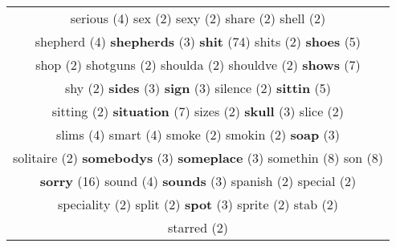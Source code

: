 \documentclass[12pt,a4paper]{article}
\begin{document}
\begin{center}
\begin{longtable}{|c|}
{\normalsize \textcolor{VerdeLocao} {serious}} \footnotesize{(4)} {\footnotesize \textcolor{Verde} {sex}} \footnotesize{(2)} {\footnotesize \textcolor{Verde} {sexy}} \footnotesize{(2)} {\footnotesize \textcolor{Verde} {share}} \footnotesize{(2)} {\footnotesize \textcolor{Verde} {shell}} \footnotesize{(2)}  \\ {\normalsize \textcolor{VerdeLocao} {shepherd}} \footnotesize{(4)} {\small \textcolor{Laranja} {\bf shepherds}} \footnotesize{(3)} {\Huge \textcolor{AzulEscuro} {\bf shit}} \footnotesize{(74)} {\footnotesize \textcolor{Verde} {shits}} \footnotesize{(2)} {\large \textcolor{Roxo} {\bf shoes}} \footnotesize{(5)}  \\ {\footnotesize \textcolor{Verde} {shop}} \footnotesize{(2)} {\footnotesize \textcolor{Verde} {shotguns}} \footnotesize{(2)} {\footnotesize \textcolor{Verde} {shoulda}} \footnotesize{(2)} {\footnotesize \textcolor{Verde} {shouldve}} \footnotesize{(2)} {\LARGE \textcolor{Rosa} {\bf shows}} \footnotesize{(7)}  \\ {\footnotesize \textcolor{Verde} {shy}} \footnotesize{(2)} {\small \textcolor{Laranja} {\bf sides}} \footnotesize{(3)} {\small \textcolor{Laranja} {\bf sign}} \footnotesize{(3)} {\footnotesize \textcolor{Verde} {silence}} \footnotesize{(2)} {\large \textcolor{Roxo} {\bf sittin}} \footnotesize{(5)}  \\ {\footnotesize \textcolor{Verde} {sitting}} \footnotesize{(2)} {\LARGE \textcolor{Rosa} {\bf situation}} \footnotesize{(7)} {\footnotesize \textcolor{Verde} {sizes}} \footnotesize{(2)} {\small \textcolor{Laranja} {\bf skull}} \footnotesize{(3)} {\footnotesize \textcolor{Verde} {slice}} \footnotesize{(2)}  \\ {\normalsize \textcolor{VerdeLocao} {slims}} \footnotesize{(4)} {\normalsize \textcolor{VerdeLocao} {smart}} \footnotesize{(4)} {\footnotesize \textcolor{Verde} {smoke}} \footnotesize{(2)} {\footnotesize \textcolor{Verde} {smokin}} \footnotesize{(2)} {\small \textcolor{Laranja} {\bf soap}} \footnotesize{(3)}  \\ {\footnotesize \textcolor{Verde} {solitaire}} \footnotesize{(2)} {\small \textcolor{Laranja} {\bf somebodys}} \footnotesize{(3)} {\small \textcolor{Laranja} {\bf someplace}} \footnotesize{(3)} {\huge \textcolor{Amarelo} {somethin}} \footnotesize{(8)} {\huge \textcolor{Amarelo} {son}} \footnotesize{(8)}  \\ {\Huge \textcolor{AzulEscuro} {\bf sorry}} \footnotesize{(16)} {\normalsize \textcolor{VerdeLocao} {sound}} \footnotesize{(4)} {\small \textcolor{Laranja} {\bf sounds}} \footnotesize{(3)} {\footnotesize \textcolor{Verde} {spanish}} \footnotesize{(2)} {\footnotesize \textcolor{Verde} {special}} \footnotesize{(2)}  \\ {\footnotesize \textcolor{Verde} {speciality}} \footnotesize{(2)} {\footnotesize \textcolor{Verde} {split}} \footnotesize{(2)} {\small \textcolor{Laranja} {\bf spot}} \footnotesize{(3)} {\footnotesize \textcolor{Verde} {sprite}} \footnotesize{(2)} {\footnotesize \textcolor{Verde} {stab}} \footnotesize{(2)}  \\ {\footnotesize \textcolor{Verde} {starred}} \footnotesize{(2)} {\LARGE 
\end{longtable}
\end{center}
\end{document}
